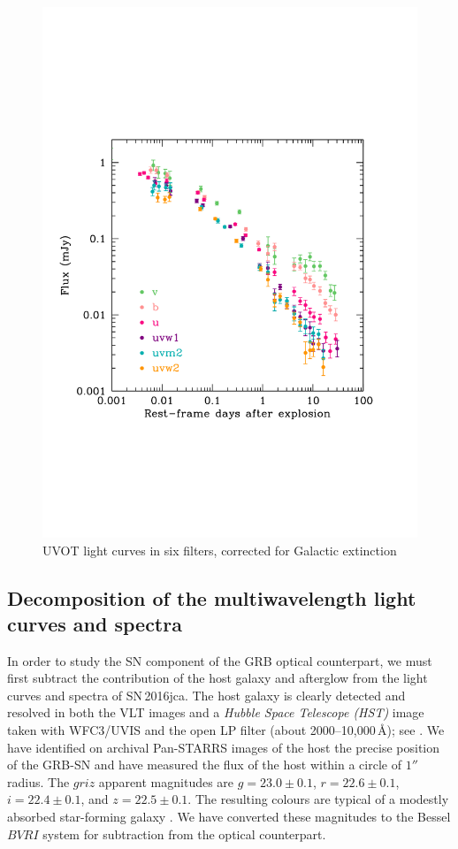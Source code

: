 \documentclass[fleqn,usenatbib]{mnras}
\begin{document}
\begin{figure}
\centering
\includegraphics[scale=0.4]{plots/1.pdf}
\caption{UVOT light curves in six filters, corrected for Galactic extinction}
\label{fig:UVOTLCS}
\end{figure}



\subsection{Decomposition of the multiwavelength light curves and spectra}


In order to study the SN component of the GRB optical counterpart, we must first subtract the contribution of the host galaxy and afterglow from the light curves and spectra of SN\,2016jca.
The host galaxy is clearly detected and resolved in both the VLT images and 
a {\it Hubble Space Telescope (HST)} image taken with WFC3/UVIS and the open LP filter (about 2000--10,000\,\AA); see \citet{Cano17}. 
We have identified on archival Pan-STARRS images of the host the precise position of the GRB-SN  and have measured the flux of the host within a circle of $1''$ radius.  
The $griz$ apparent magnitudes are $g = 23.0 \pm 0.1$, $r = 22.6 \pm 0.1$,  $i = 22.4 \pm 0.1$, and $z = 22.5  \pm 0.1$. 
The resulting colours are typical of  a modestly absorbed star-forming galaxy \citep{Kinney96}.  We have converted these magnitudes to the Bessel $BVRI$ system for subtraction from the optical counterpart.   
\end{document}
